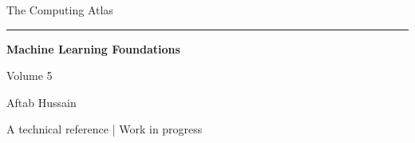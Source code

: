 \documentclass[11pt,oneside,openany]{book}
\begin{document}
\frontmatter
\begin{titlepage}
\centering
\vspace*{3.7cm}
{\Large The Computing Atlas\par}
\vspace{0.65cm}
\rule{0.6\textwidth}{0.5pt}\par
\vspace{0.75cm}
{\Huge\bfseries Machine Learning Foundations\par}
\vspace{1.0cm}
{\large Volume 5\par}
\vfill
{\large Aftab Hussain\par}
\vspace{0.6cm}
{\small A technical reference | Work in progress\par}
\vspace{1.2cm}
\end{titlepage}
\tableofcontents
\mainmatter

\end{document}
